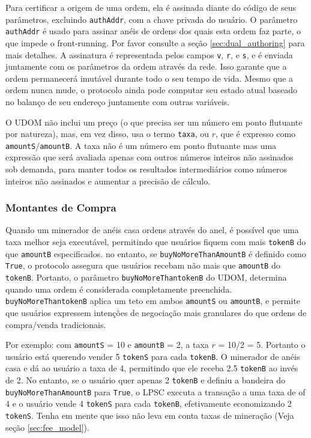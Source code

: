 \documentclass[UTF8,nofonts]{article}
\begin{document}
\begin{multicols}{2}
Para certificar a origem de uma ordem, ela é assinada diante do código de seus parâmetros, excluindo \verb|authAddr|, com a chave privada do usuário. O parâmetro \verb|authAddr| é usado para assinar anéis de ordens dos quais esta ordem faz parte, o que impede o front-running. Por favor consulte a seção \ref{sec:dual_authoring} para mais detalhes. A assinatura é representada pelos campos \verb|v|, \verb|r|, e \verb|s|, e é enviada juntamente com os parâmetros da ordem através da rede. Isso garante que a ordem permanecerá imutável durante todo o seu tempo de vida. Mesmo que a ordem nunca mude, o protocolo ainda pode computar seu estado atual baseado no balanço de seu endereço juntamente com outras variáveis.

O UDOM não inclui um preço (o que precisa ser um número em ponto flutuante por natureza), mas, em vez disso, usa o termo \verb|taxa|, ou $r$, que é expresso como \verb|amountS|/\verb|amountB|. A taxa não é um número em ponto flutuante mas uma expressão que será avaliada apenas com outros números inteiros não assinados sob demanda, para manter todos os resultados intermediários como números inteiros não assinados e aumentar a precisão de cálculo.

\subsubsection{Montantes de Compra}

Quando um minerador de anéis casa ordens através do anel, é possível que uma taxa melhor seja executável, permitindo que usuários fiquem com mais \verb|tokenB| do que \verb|amountB| especificados. no entanto, se \verb|buyNoMoreThanAmountB| é definido como \verb|True|, o protocolo assegura que usuários recebam não mais que \verb|amountB| do \verb|tokenB|. Portanto, o parâmetro \verb|buyNoMoreThantokenB| do UDOM, determina quando uma ordem é considerada completamente preenchida. \verb|buyNoMoreThantokenB| aplica um teto em ambos \verb|amountS| ou \verb|amountB|, e permite que usuários expressem intenções de negociação mais granulares do que ordens de compra/venda tradicionais.

Por exemplo: com \verb|amountS| = 10 e \verb|amountB| = 2, a taxa $r$ = 10/2 = 5. Portanto o usuário está querendo vender 5 \verb|tokenS| para cada \verb|tokenB|. O minerador de anéis casa e dá ao usuário a taxa de 4, permitindo que ele receba 2.5 \verb|tokenB| ao invés de 2. No entanto, se o usuário quer apenas 2 \verb|tokenB| e definiu a bandeira do \verb|buyNoMoreThanAmountB| para \verb|True|, o LPSC executa a transação a uma taxa de of 4 e o usuário vende 4 \verb|tokenS| para cada \verb|tokenB|, efetivamente economizando 2 \verb|tokenS|. Tenha em mente que isso não leva em conta taxas de mineração (Veja seção \ref{sec:fee_model}).


\end{multicols}
\end{document}
